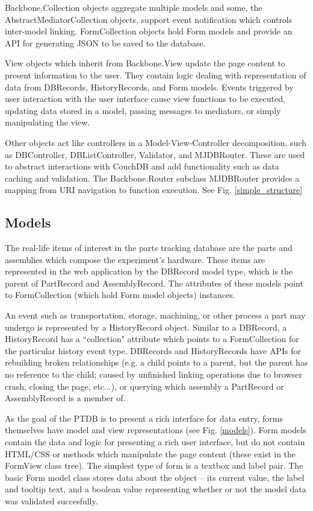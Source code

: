 \documentclass[journal]{IEEEtran}
\begin{document}
Backbone.Collection objects aggregate multiple models and some, the AbstractMediatorCollection objects, support event notification
which controls inter-model linking. FormCollection objects hold Form models and provide an API for generating JSON to be
saved to the database.

View objects which inherit from Backbone.View update the page content to present information to the user. They contain logic dealing with
representation of data from DBRecords, HistoryRecords, and Form models. Events triggered by user interaction with the user interface cause 
view functions to be executed, updating data stored in a model, passing messages to mediators, or simply manipulating the view.

Other objects act like controllers in a Model-View-Controller decomposition, such as DBController, DBListController, Validator,
and MJDBRouter. These are used to abstract interactions with CouchDB and add functionality such as data caching and validation. 
The Backbone.Router subclass MJDBRouter provides a mapping from URI navigation to function execution. See Fig. \ref{simple_structure}

\subsection{Models}
The real-life items of interest in the parts tracking database are the parts and assemblies which compose
the experiment's hardware. These items are represented in the web application by the DBRecord model type, which is
the parent of PartRecord and AssemblyRecord. The attributes of these models point to FormCollection (which hold
Form model objects) instances.

An event such as transportation, storage, machining, or other process a part may undergo is represented by a 
HistoryRecord object. Similar to a DBRecord, a HistoryRecord has a ``collection" attribute which points to a
FormCollection for the particular history event type. DBRecords and HistoryRecords have APIs for rebuilding
broken relationships (e.g. a child points to a parent, but the parent has no reference to the child; caused by 
unfinished linking operations due to browser crash, closing the page, etc...), or querying
which assembly a PartRecord or AssemblyRecord is a member of.

As the goal of the PTDB is to present a rich interface for data entry, forms
themselves have model and view representations (see Fig. \ref{models}). 
Form models contain the data and logic for presenting a rich user interface, but do not contain HTML/CSS or
methods which manipulate the page content (these exist in the FormView class tree).
The simplest type of form is a textbox and label pair. The basic Form model class stores data 
about the object -- its current value, the label and tooltip text,
and a boolean value representing whether or not the model data was validated succesfully.
\end{document}
